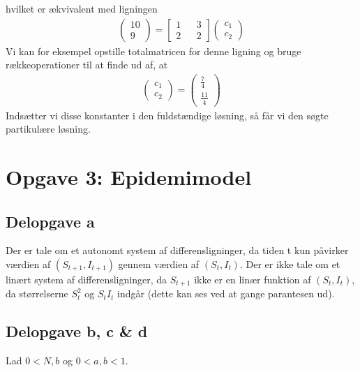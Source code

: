 \documentclass[12pt]{article}
\begin{document}
hvilket er ækvivalent med ligningen
\begin{align}
\begin{pmatrix}
10\\9
\end{pmatrix} = \begin{bmatrix}
1 && 3\\
2 && 2
\end{bmatrix} \begin{pmatrix}
c_1 \\ c_2
\end{pmatrix}
\end{align}
Vi kan for eksempel opstille totalmatricen for denne ligning og bruge rækkeoperationer til at finde ud af, at 
\begin{align}
\begin{pmatrix}
c_1\\c_2 
\end{pmatrix} = \begin{pmatrix}
\frac{7}{4}\\ \frac{11}{4}
\end{pmatrix}
\end{align}
Indsætter vi disse konstanter i den fuldstændige løsning, så får vi den søgte partikulære løsning.

\section{Opgave 3: Epidemimodel}

\subsection{Delopgave a}

Der er tale om et autonomt system af differensligninger, da tiden t kun påvirker værdien af $(S_{t+1}, I_{t+1})$ gennem værdien af $(S_t, I_t)$. Der er ikke tale om et linært system af differensligninger, da $S_{t+1}$ ikke er en linær funktion af $(S_t, I_t)$, da størrelserne $S_t^2$ og $S_tI_t$ indgår (dette kan ses ved at gange parantesen ud).

\subsection{Delopgave b, c \& d}

Lad $0 < N, b$ og $0 < a,b < 1$. 
\end{document}

